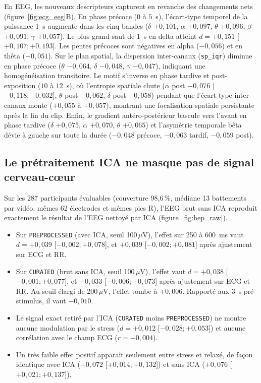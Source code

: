\documentclass[10pt]{article}
\begin{document}
En EEG, les nouveaux descripteurs capturent en revanche des changements nets (figure~\ref{fig:ecg_eeg}B). En phase précoce ($0$ à $5$~s), l'écart-type temporel de la puissance 1~s augmente dans les cinq bandes ($\delta$ $+0{,}101$, $\alpha$ $+0{,}097$, $\theta$ $+0{,}096$, $\beta$ $+0{,}091$, $\gamma$ $+0{,}057$). Le plus grand saut de 1~s en delta atteint $d = +0{,}151$ [$+0{,}107 ; +0{,}193$]. Les pentes précoces sont négatives en alpha ($-0{,}056$) et en thêta ($-0{,}051$). Sur le plan spatial, la dispersion inter-canaux (\texttt{sp\_iqr}) diminue en phase précoce ($\theta$ $-0{,}064$, $\delta$ $-0{,}048$, $\gamma$ $-0{,}047$), indiquant une homogénéisation transitoire. Le motif s'inverse en phase tardive et post-exposition ($10$ à $12$~s), où l'entropie spatiale chute ($\alpha$ post $-0{,}076$ [$-0{,}118 ; -0{,}032$], $\theta$ post $-0{,}062$, $\delta$ post $-0{,}058$) pendant que l'écart-type inter-canaux monte ($+0{,}055$ à $+0{,}057$), montrant une focalisation spatiale persistante après la fin du clip. Enfin, le gradient antéro-postérieur bascule vers l'avant en phase tardive ($\delta$ $+0{,}075$, $\alpha$ $+0{,}070$, $\theta$ $+0{,}065$) et l'asymétrie temporale bêta dévie à gauche sur toute la durée ($-0{,}048$ précoce, $-0{,}063$ tardif, $-0{,}059$ post).

\subsection{Le prétraitement ICA ne masque pas de signal cerveau-cœur}

Sur les 287 participants évaluables (couverture 98,6\,\%, médiane 13 battements par vidéo, mêmes 62 électrodes et mêmes pics R), l'EEG brut sans ICA reproduit exactement le résultat de l'EEG nettoyé par ICA (figure~\ref{fig:hep_raw}).
\begin{itemize}
\item Sur \texttt{PREPROCESSED} (avec ICA, seuil 100\,$\mu$V), l'effet sur 250 à 600~ms vaut $d = +0{,}039$ [$-0{,}002 ; +0{,}078$], et $+0{,}039$ [$-0{,}002 ; +0{,}081$] après ajustement sur ECG et RR.
\item Sur \texttt{CURATED} (brut sans ICA, seuil 100\,$\mu$V), l'effet vaut $d = +0{,}038$ [$-0{,}001 ; +0{,}077$], et $+0{,}033$ [$-0{,}006 ; +0{,}073$] après ajustement sur ECG et RR. Au seuil élargi de 200\,$\mu$V, l'effet tombe à $+0{,}006$. Rapporté aux 3~s pré-stimulus, il vaut $-0{,}010$.
\item Le signal exact retiré par l'ICA (\texttt{CURATED} moins \texttt{PREPROCESSED}) ne montre aucune modulation par le stress ($d = +0{,}012$ [$-0{,}028 ; +0{,}053$]) et aucune corrélation avec le champ ECG ($r = -0{,}004$).
\item Un très faible effet positif apparaît seulement entre stress et relaxé, de façon identique avec ICA ($+0{,}072$ [$+0{,}014 ; +0{,}132$]) et sans ICA ($+0{,}076$ [$+0{,}021 ; +0{,}137$]).
\end{itemize}
\end{document}
